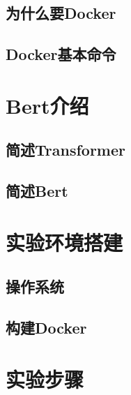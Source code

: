 \documentclass[UTF8]{ctexart}
\begin{document}
\subsection{为什么要Docker} %

\subsection{Docker基本命令} %

\section{Bert介绍} %

\subsection{简述Transformer} %

\subsection{简述Bert} %

\section{实验环境搭建} %

\subsection{操作系统} %

\subsection{构建Docker} %

\section{实验步骤}
\end{document}
